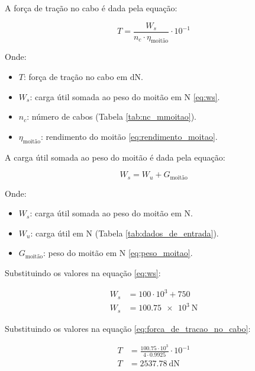 A força de tração no cabo é dada pela equação:

\begin{equation}
  T = \frac{W_s}{n_c \cdot \eta_{\text{moitão}}} \cdot 10^{-1}
  \label{eq:forca_de_tracao_no_cabo}
\end{equation}

Onde:

\begin{itemize}[leftmargin=1.25cm]
  \item $T$: força de tração no cabo em $\si{\deca\newton}$.
  \item $W_s$: carga útil somada ao peso do moitão em $\si{\newton}$ \eqref{eq:ws}.
  \item $n_c$: número de cabos (Tabela \ref{tab:nc_mmoitao}).
  \item $\eta_{\text{moitão}}$: rendimento do moitão \eqref{eq:rendimento_moitao}.
\end{itemize}

\vspace{1em}

A carga útil somada ao peso do moitão é dada pela equação:

\begin{equation}
  W_s = W_u + G_{\text{moitão}}
  \label{eq:ws}
\end{equation}

Onde:

\begin{itemize}[leftmargin=1.25cm]
  \item $W_s$: carga útil somada ao peso do moitão em $\si{\newton}$.
  \item $W_u$: carga útil em $\si{\newton}$ (Tabela \ref{tab:dados_de_entrada}).
  \item $G_{\text{moitão}}$: peso do moitão em $\si{\newton}$ \eqref{eq:peso_moitao}.
\end{itemize}

\vspace{1em}

Substituindo os valores na equação \eqref{eq:ws}:

\begin{align*}
  W_s & = 100 \cdot 10^3 + 750           \\
  W_s & = \boxed{\SI{100.75e3}{\newton}}
\end{align*}

Substituindo os valores na equação \eqref{eq:forca_de_tracao_no_cabo}:

\begin{align*}
  T & = \frac{\num{100.75} \cdot 10^3}{4 \cdot \num{0.9925}} \cdot 10^{-1} \\
  T & = \boxed{\SI{2537.78}{\deca\newton}}
\end{align*}
